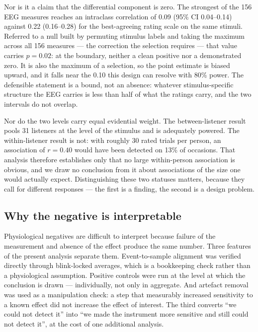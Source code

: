 Nor is it a claim that the differential component is zero. The strongest of the
156 EEG measures reaches an intraclass correlation of 0.09 (95\% CI 0.04--0.14)
against 0.22 (0.16--0.28) for the best-agreeing rating scale on the same stimuli.
Referred to a null built by permuting stimulus labels and taking the maximum across
all 156 measures --- the correction the selection requires --- that value carries
$p = 0.02$: at the boundary, neither a clean positive nor a demonstrated zero. It is
also the maximum of a selection, so the point estimate is biased upward, and it
falls near the 0.10 this design can resolve with 80\% power. The defensible
statement is a bound, not an absence: whatever stimulus-specific structure the EEG
carries is less than half of what the ratings carry, and the two intervals do not
overlap.

Nor do the two levels carry equal evidential weight. The between-listener result
pools 31 listeners at the level of the stimulus and is adequately powered. The
within-listener result is not: with roughly 30 rated trials per person, an
association of $r = 0.40$ would have been detected on 13\% of occasions. That
analysis therefore establishes only that no large within-person association is
obvious, and we draw no conclusion from it about associations of the size one would
actually expect. Distinguishing these two statuses matters, because they call for
different responses --- the first is a finding, the second is a design problem.

\subsection*{Why the negative is interpretable}

Physiological negatives are difficult to interpret because failure of the
measurement and absence of the effect produce the same number. Three features of
the present analysis separate them. Event-to-sample alignment was verified directly
through blink-locked averages, which is a bookkeeping check rather than a
physiological assumption. Positive controls were run at the level at which the
conclusion is drawn --- individually, not only in aggregate. And artefact removal
was used as a manipulation check: a step that measurably increased sensitivity to a
known effect did not increase the effect of interest. The third converts ``we could
not detect it'' into ``we made the instrument more sensitive and still could not
detect it'', at the cost of one additional analysis.

